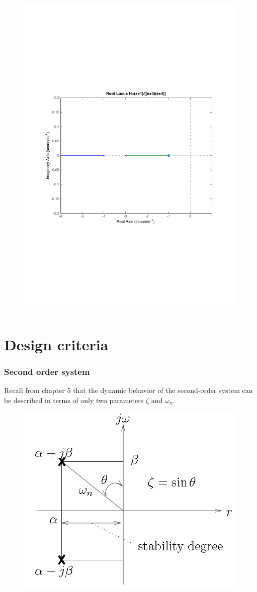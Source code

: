 \begin{frame}
\begin{alertblock}{}
\begin{columns}
\begin{column}{0.5\textwidth}
\begin{figure}
				\includegraphics[width=0.8\linewidth]{how_to_draw_easy_ex2}
			\end{figure}
		\end{column}
	\end{columns}
	\end{alertblock}
\end{frame}

\section{Design criteria}

\begin{frame}
\frametitle{Second order system}
	Recall from chapter 5 that the dynamic behavior of the second-order system can be described in terms of only two parameters $\zeta$ and $\omega_n$.
	\vspace{-1em}
	\begin{figure}
		\centering
		\includegraphics[width=0.6\linewidth]{poles_system}
	\end{figure}
\end{frame}

